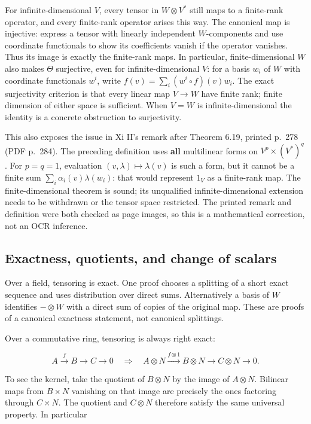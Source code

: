 \documentclass[
  11pt,
]{article}
\begin{document}
For infinite-dimensional \(V\), every tensor in \(W\otimes V^*\) still
maps to a finite-rank operator, and every finite-rank operator arises
this way. The canonical map is injective: express a tensor with linearly
independent \(W\)-components and use coordinate functionals to show its
coefficients vanish if the operator vanishes. Thus its image is exactly
the finite-rank maps. In particular, finite-dimensional \(W\) also makes
\(\Theta\) surjective, even for infinite-dimensional \(V\): for a basis
\(w_i\) of \(W\) with coordinate functionals \(w^i\), write
\(f(v)=\sum_i(w^i\circ f)(v)w_i\). The exact surjectivity criterion is
that every linear map \(V\to W\) have finite rank; finite dimension of
either space is sufficient. When \(V=W\) is infinite-dimensional the
identity is a concrete obstruction to surjectivity.

This also exposes the issue in Xi II's remark after Theorem 6.19,
printed p.~278 (PDF p.~284). The preceding definition uses \textbf{all}
multilinear forms on \(V^p\times(V^*)^q\). For \(p=q=1\), evaluation
\((v,\lambda)\mapsto\lambda(v)\) is such a form, but it cannot be a
finite sum \(\sum_i\alpha_i(v)\lambda(w_i)\): that would represent
\(1_V\) as a finite-rank map. The finite-dimensional theorem is sound;
its unqualified infinite-dimensional extension needs to be withdrawn or
the tensor space restricted. The printed remark and definition were both
checked as page images, so this is a mathematical correction, not an OCR
inference.

\subsection{Exactness, quotients, and change of
scalars}\label{exactness-quotients-and-change-of-scalars}

Over a field, tensoring is exact. One proof chooses a splitting of a
short exact sequence and uses distribution over direct sums.
Alternatively a basis of \(W\) identifies \(-\otimes W\) with a direct
sum of copies of the original map. These are proofs of a canonical
exactness statement, not canonical splittings.

Over a commutative ring, tensoring is always right exact:

\[A\xrightarrow{f}B\longrightarrow C\longrightarrow0
\quad\Longrightarrow\quad
A\otimes N\xrightarrow{f\otimes1}B\otimes N
\longrightarrow C\otimes N\longrightarrow0.\]

To see the kernel, take the quotient of \(B\otimes N\) by the image of
\(A\otimes N\). Bilinear maps from \(B\times N\) vanishing on that image
are precisely the ones factoring through \(C\times N\). The quotient and
\(C\otimes N\) therefore satisfy the same universal property. In
particular
\end{document}
